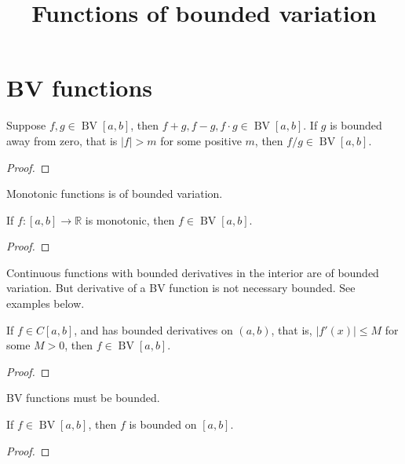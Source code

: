 \documentclass{article}
\title{Functions of bounded variation}
\newcommand{\R}{\mathbb R}
\DeclareMathOperator{\BV}{BV}
\begin{document}
\maketitle
\tableofcontents

\section{BV functions}
\begin{theorem}
    Suppose $ f, g \in \BV[a, b] $, then $ f + g, f - g, f \cdot g \in \BV[a, b] $. If $ g $ is bounded away from zero, that is $ |f| > m $ for some positive $ m $, then $ f / g \in \BV[a, b] $.
\end{theorem}

\begin{proof}
    
\end{proof}

Monotonic functions is of bounded variation. 

\begin{theorem} \label{thm:monotonic-implies-BV}
    If $ f \colon [a, b] \to \R $ is monotonic, then $ f \in \BV[a, b] $.
\end{theorem}

\begin{proof}
    
\end{proof}

Continuous functions with bounded derivatives in the interior are of bounded variation. But derivative of a BV function is not necessary bounded. See examples below.

\begin{theorem} \label{thm:bounded-derivative}
    If $ f \in C[a, b] $, and has bounded derivatives on $ (a, b) $, that is, $ |f'(x)| \leqslant M $ for some $ M > 0 $, then $ f \in \BV[a, b] $.
\end{theorem}


\begin{proof}
    
\end{proof}

BV functions must be bounded.

\begin{theorem} \label{thm:BV-necessary}
    If $ f \in \BV[a, b] $, then $ f $ is bounded on $ [a, b] $.
\end{theorem}

\begin{proof}
    
\end{proof}
\end{document}
